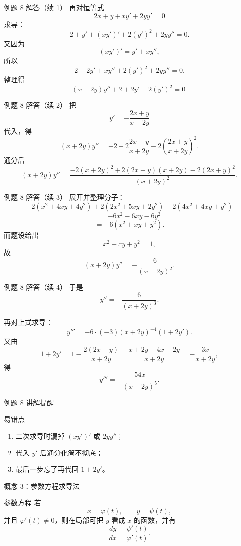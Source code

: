 ﻿\documentclass[aspectratio=169,10pt]{ctexbeamer}
\begin{document}
\begin{frame}[t]{例题 8 解答（续 1）}
\small
再对恒等式
\[
2x+y+xy'+2yy'=0
\]
求导：
\[
2+y'+(xy')'+2(y')^2+2yy''=0.
\]
又因为
\[
(xy')'=y'+xy'',
\]
所以
\[
2+2y'+xy''+2(y')^2+2yy''=0.
\]
整理得
\[
(x+2y)y''+2+2y'+2(y')^2=0.
\]
\end{frame}

\begin{frame}[t]{例题 8 解答（续 2）}
\small
把
\[
y'=-\frac{2x+y}{x+2y}
\]
代入，得
\[
(x+2y)y''
=-2+2\frac{2x+y}{x+2y}-2\left(\frac{2x+y}{x+2y}\right)^2.
\]
通分后
\[
(x+2y)y''
=\frac{-2(x+2y)^2+2(2x+y)(x+2y)-2(2x+y)^2}{(x+2y)^2}.
\]
\end{frame}

\begin{frame}[t]{例题 8 解答（续 3）}
\small
展开并整理分子：
\[
-2(x^2+4xy+4y^2)+2(2x^2+5xy+2y^2)-2(4x^2+4xy+y^2)
\]
\[
=-6x^2-6xy-6y^2
\]
\[
=-6(x^2+xy+y^2).
\]
而题设给出
\[
x^2+xy+y^2=1,
\]
故
\[
(x+2y)y''=-\frac{6}{(x+2y)^2}.
\]
\end{frame}

\begin{frame}[t]{例题 8 解答（续 4）}
\small
于是
\[
\boxed{y''=-\frac{6}{(x+2y)^3}.}
\]

再对上式求导：
\[
y'''=-6\cdot(-3)(x+2y)^{-4}(1+2y').
\]
又由
\[
1+2y'=1-\frac{2(2x+y)}{x+2y}
=\frac{x+2y-4x-2y}{x+2y}
=-\frac{3x}{x+2y},
\]
得
\[
\boxed{y'''=-\frac{54x}{(x+2y)^5}.}
\]
\end{frame}

\begin{frame}[t]{例题 8 讲解提醒}
\small
\begin{block}{易错点}
\begin{enumerate}
  \item 二次求导时漏掉 $(xy')'$ 或 $2yy''$；
  \item 代入 $y'$ 后通分化简不彻底；
  \item 最后一步忘了再代回 $1+2y'$。
\end{enumerate}
\end{block}
\end{frame}

\begin{frame}[t]{概念 3：参数方程求导法}
\small
\begin{block}{参数方程}
若
\[
x=\varphi(t),\qquad y=\psi(t),
\]
并且 $\varphi'(t)\ne0$，则在局部可把 $y$ 看成 $x$ 的函数，并有
\[
\boxed{\frac{dy}{dx}=\frac{\psi'(t)}{\varphi'(t)}}.
\]
\end{block}
\end{frame}
\end{document}
